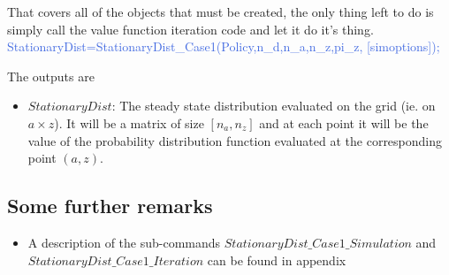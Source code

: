 That covers all of the objects that must be created, the only thing left to do is simply call the value function iteration code and let it do it's thing. \\
\textcolor{RoyalBlue}{StationaryDist=StationaryDist\_{}Case1(Policy,n\_{}d,n\_{}a,n\_{}z,pi\_{}z, [simoptions]);}

The outputs are
\begin{itemize}
 \item $StationaryDist$: The steady state distribution evaluated on the grid (ie. on $a \times z$). It will be a matrix of size $[n_a,n_z]$ and at each point
    it will be the value of the probability distribution function evaluated at the corresponding point $(a,z)$.
\end{itemize}

\subsection{Some further remarks}
\begin{itemize}
 \item A description of the sub-commands $StationaryDist\_{}Case1\_{}Simulation$ and \\ $StationaryDist\_{}Case1\_{}Iteration$ can be found in appendix
\end{itemize}

